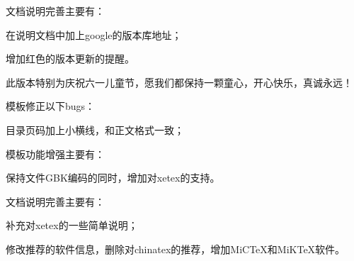 文档说明完善主要有：
\begin{hitlist}
   \item 在说明文档中加上google的版本库地址；
   \item 增加红色的版本更新的提醒。
\end{hitlist}


此版本特别为庆祝六一儿童节，愿我们都保持一颗童心，开心快乐，真诚永远！

模板修正以下bugs：
\begin{hitlist}
    \item 目录页码加上小横线，和正文格式一致；    
\end{hitlist}


模板功能增强主要有：
\begin{hitlist}
    \item 保持文件GBK编码的同时，增加对xetex的支持。
\end{hitlist}

文档说明完善主要有：
\begin{hitlist}
   \item 补充对xetex的一些简单说明；
   \item 修改推荐的软件信息，删除对chinatex的推荐，增加MiCTeX和MiKTeX软件。
\end{hitlist}
